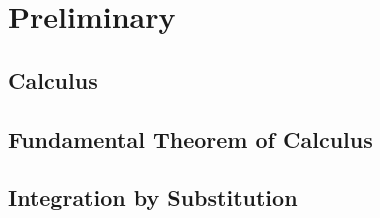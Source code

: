 \chapter{Preliminary}

\section{Calculus}

\begin{theorem}
\end{theorem}

\begin{theorem}
\end{theorem}

\begin{theorem}
\end{theorem}

\begin{theorem}
\end{theorem}

\begin{theorem}
\end{theorem}

\section{Fundamental Theorem of Calculus}

\section{Integration by Substitution}




